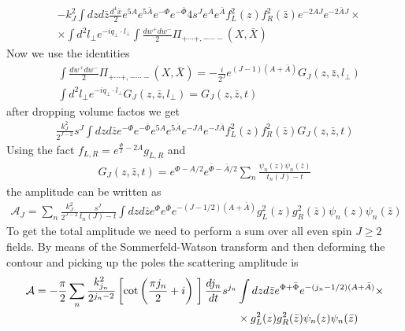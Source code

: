 \documentclass[12pt,a4paper]{article}
\begin{document}
\begin{align}
    & - k_J^2 \int dz d\bar{z} \frac{d^4 \bar{x}}{2} e^{5 A} e^{5 \bar{A}} e^{-\Phi} e^{-\bar{\Phi}} 4 s^J e^A e^{\bar{A}} f_L^2\left(z\right)f_R^2\left(\bar{z}\right) e^{-2 A J} e^{-2 \bar{A} J} \times \\
    & \times \int d^2l_\perp e^{- i q_\perp \cdot l_\perp} \int \frac{dw^+ dw^-}{2} \Pi_{+ \cdots +, - \cdots -} \left(X, \bar{X} \right)
\end{align}
Now we use the identities
\begin{align}
    & \int \frac{dw^+ dw^-}{2} \Pi_{+ \cdots +, - \cdots -} \left(X , \bar{X}\right) = - \frac{i}{2^J} e^{\left(J-1\right)\left( A +\bar{A} \right)} G_J \left(z, \bar{z}, l_\perp \right) \\
    & \int d^2 l_\perp e^{- i q_\perp \cdot l_\perp} G_J \left(z, \bar{z}, l_\perp \right) = G_J \left(z, \bar{z}, t \right)
\end{align}
after dropping volume factos we get
\begin{align}
    \frac{k_J^2}{2^{J-2}} s^J \int dz d\bar{z} e^{-\Phi} e^{-\bar{\Phi}} e^{5 A} e^{5 \bar{A}} e^{-J A} e^{- J \bar{A}} f_L^2\left(z\right)f_R^2\left(\bar{z}\right)  G_J \left(z, \bar{z}, t \right)
\end{align}
Using the fact $f_{L,R} = e^{\frac{\Phi}{2} - 2 A} g_{L,R}$ and
\begin{align}
    G_J \left(z, \bar{z}, t \right) = e^{\Phi - A/2}e^{\bar{\Phi} - \bar{A}/2} \sum_n \frac{\psi_n (z) \psi_n (\bar{z})}{t_n (J)-t}
\end{align}
the amplitude can be written as
\begin{align}
    \mathcal{A}_J = \sum_n \frac{k_J^2}{2^{J-2}} \frac{s^J}{t_n (J)-t} \int dz d\bar{z} e^{\Phi} e^{\bar{\Phi}} e^{-(J-1/2)(A+\bar{A})} g_L^2 (z) g_R^2 (\bar{z}) \psi_n (z) \psi_n (\bar{z})
\end{align}
To get the total amplitude we need to perform a sum over all even spin $J \geq 2$ fields. By means of the Sommerfeld-Watson transform and then deforming the contour and picking up the poles the scattering amplitude is
\begin{align}
    \mathcal{A} = -\frac{\pi}{2} \sum_n \frac{k_{j_n}^2}{2^{j_n -2}} \left[ \cot \left( \frac{\pi j_n}{2} + i \right) \right] \frac{d j_n}{dt} s^{j_n} & \int dz d\bar{z} e^{\Phi + \bar{\Phi}} e^{- (j_n - 1 /2)(A + \bar{A})} \times \\ \notag
    & \times g_L^2 (z) g_R^2 (\bar{z}) \psi_n (z) \psi_n (\bar{z})
\end{align}
\end{document}
